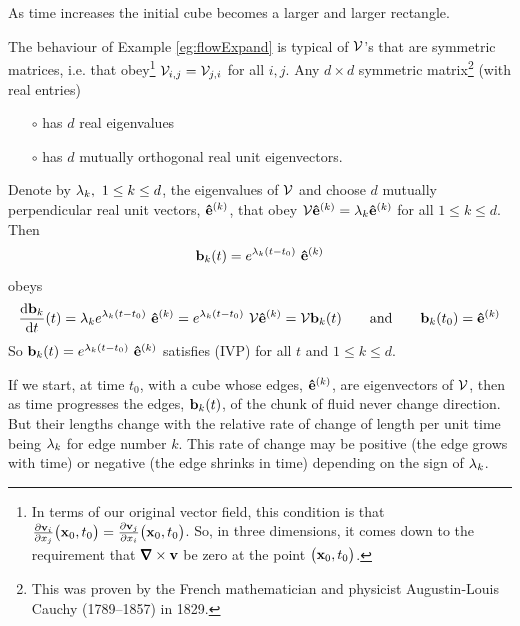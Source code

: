 As time increases the initial cube becomes a larger and larger rectangle.

\begin{eg}\label{eg:flowExpandB}
The behaviour of Example \ref{eg:flowExpand} is typical of $\mathcal{V}$'s 
that are symmetric matrices,
i.e. that obey\footnote{In terms of our original vector field, this condition
is that 
$\frac{\partial \mathbf{v}_i}{\partial x_j}\big(\mathbf{x}_0,t_0\big)
=\frac{\partial \mathbf{v}_j}{\partial x_i}\big(\mathbf{x}_0,t_0\big)$.
So, in three dimensions, it comes down to the requirement that 
$\vnabla\times\vv$ be zero at the point $\big(\mathbf{x}_0,t_0\big)$.}
 $\mathcal{V}_{i,j}=\mathcal{V}_{j,i}$ for all $i,j$. 
Any $d\times d$ symmetric matrix\footnote{This was proven by the French mathematician and physicist Augustin-Louis Cauchy (1789--1857) in 1829.} 
(with real entries)
\begin{itemize}\itemsep1pt \parskip0pt  %
\item[$\circ$]
 has $d$ real eigenvalues
\item[$\circ$] 
has $d$ mutually orthogonal real unit eigenvectors.
\end{itemize}
Denote by $\lambda_k,\ 1\le k\le d$, the eigenvalues of $\mathcal{V}$ and choose
$d$ mutually perpendicular real unit vectors, $\mathbf{\hat e}^{(k)}$,  that obey 
$\mathcal{V}\mathbf{\hat e}^{(k)}=\lambda_k\mathbf{\hat e}^{(k)}$ for all $1\le k\le d$. Then
\begin{equation*}
\vb_k(t)=e^{\la_k (t-t_0)}\ \ha{k}
\end{equation*}
obeys
\begin{equation*}
\diff{\vb_k}{t}(t)=\la_ke^{\la_k (t-t_0)}\ \ha{k}=e^{\la_k (t-t_0)}\ \cV\ha{k}
=\cV\vb_k(t)\qquad\text{and}\qquad
\vb_k(t_0)= \ha{k}
\end{equation*}
So $\mathbf{b}_k(t)=e^{\lambda_k (t-t_0)}\ \mathbf{\hat e}^{(k)}$ satisfies (IVP) for all $t$ and 
$1\le k\le d$. 

If we start, at time $t_0$, with a cube whose edges, $\mathbf{\hat e}^{(k)}$,
 are eigenvectors of $\mathcal{V}$, then as time progresses the edges, 
$\mathbf{b}_k(t)$, of the chunk of fluid never change direction. But their lengths 
change with the relative rate of change of length per unit time being $\lambda_k$
for edge number $k$. This rate of change may be positive (the edge grows
with time) or negative (the edge shrinks in time) depending on the sign
of $\lambda_k$. 


\end{eg}
